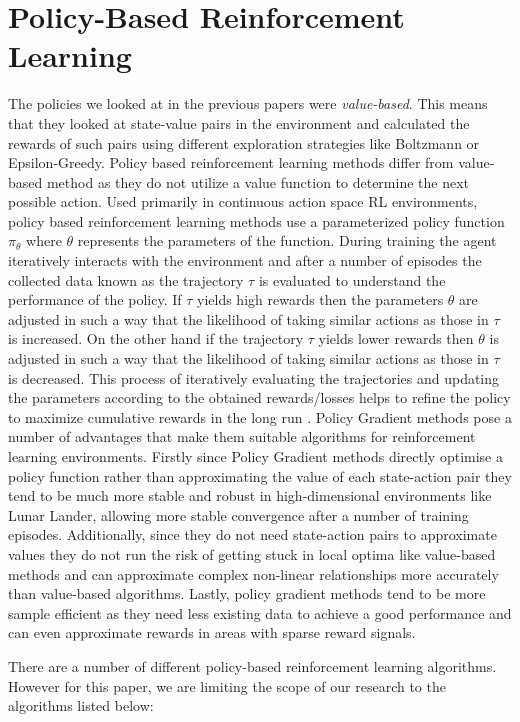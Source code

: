 \documentclass{article}
\begin{document}
\section{Policy-Based Reinforcement Learning}
The policies we looked at in the previous papers were \emph{value-based}. This means that they looked at state-value pairs in the environment and calculated the rewards of such pairs using different exploration strategies like Boltzmann or Epsilon-Greedy. Policy based reinforcement learning methods differ from value-based method as they do not utilize a value function to determine the next possible action. Used primarily in  continuous action space RL environments, policy based reinforcement learning methods use a parameterized policy function $\pi_\theta$ where $\theta$ represents the parameters of the function. 
During training the agent iteratively interacts with the environment and after a number of episodes the collected data known as the trajectory $\tau$ is evaluated to understand the performance of the policy. If $\tau$ yields high rewards then the parameters $\theta$ are adjusted in such a way that the likelihood of taking similar actions as those in $\tau$ is increased. On the other hand if the trajectory $\tau$ yields lower rewards then $\theta$ is adjusted in such a way that the likelihood of taking similar actions as those in $\tau$ is decreased. This process of iteratively evaluating the trajectories and updating the parameters according to the obtained rewards/losses helps to refine the policy to maximize cumulative rewards in the long run \cite{plaat-deeprl}. \newline
Policy Gradient methods pose a number of advantages that make them suitable algorithms for reinforcement learning environments. Firstly since Policy Gradient methods directly optimise a policy function rather than approximating the value of each state-action pair they tend to be much more stable and robust in high-dimensional environments like Lunar Lander, allowing more stable convergence after a number of training episodes. Additionally, since they do not need state-action pairs to approximate values they do not run the risk of getting stuck in local optima like value-based methods and can approximate complex non-linear relationships more accurately than value-based algorithms. Lastly, policy gradient methods tend to be more sample efficient as they need less existing data to achieve a good performance and can even approximate rewards in areas with sparse reward signals. 

\par
There are a number of different policy-based reinforcement learning algorithms. However for this paper, we are limiting the scope of our research to the algorithms listed below: 
\end{document}
